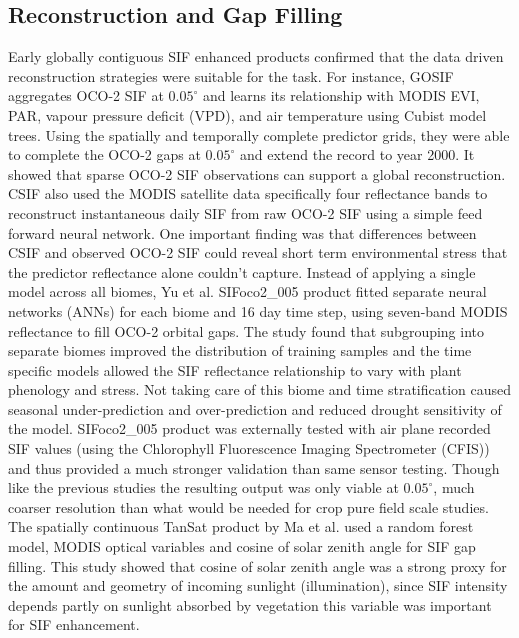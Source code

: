 \subsection{Reconstruction and Gap Filling}

Early globally contiguous SIF enhanced products confirmed that the data driven reconstruction strategies were suitable for the task. For instance, GOSIF \cite{li2019global} aggregates OCO-2 SIF at $0.05^{\circ}$ and learns its relationship with MODIS EVI, PAR, vapour pressure deficit (VPD), and air temperature using Cubist model trees. Using the spatially and temporally complete predictor grids, they were able to complete the OCO-2 gaps at $0.05^{\circ}$ and extend the record to year 2000. It showed that sparse OCO-2 SIF observations can support a global reconstruction. CSIF \cite{zhang2018global} also used the MODIS satellite data specifically four reflectance bands to reconstruct instantaneous daily SIF from raw OCO-2 SIF using a simple feed forward neural network. One important finding was that differences between CSIF and observed OCO-2 SIF could reveal short term environmental stress that the predictor reflectance alone couldn't capture. Instead of applying a single model across all biomes, Yu et al. SIFoco2\_005 product \cite{yu2019high}  fitted separate neural networks (ANNs) for each biome and 16 day time step, using seven-band MODIS reflectance to fill OCO-2 orbital gaps. The study found that subgrouping into separate biomes improved the distribution of training samples and the time specific models allowed the SIF reflectance relationship to vary with plant phenology and  stress. Not taking care of this biome and time stratification caused seasonal under-prediction and over-prediction and reduced drought sensitivity of the model. SIFoco2\_005 product was externally tested with air plane recorded SIF values (using the Chlorophyll Fluorescence Imaging Spectrometer (CFIS)) and thus provided a much stronger validation than same sensor testing. Though like the previous studies the resulting output was only viable at $0.05^{\circ}$, much coarser resolution than what would be needed for crop pure field scale studies. The spatially continuous TanSat product by Ma et al. \cite{ma2020generation} used a random forest model, MODIS optical variables and cosine of solar zenith angle for SIF gap filling. This study showed that cosine of solar zenith angle was a strong proxy for the amount and geometry of incoming sunlight (illumination), since SIF intensity depends partly on sunlight absorbed by vegetation this variable was important for SIF enhancement. 

